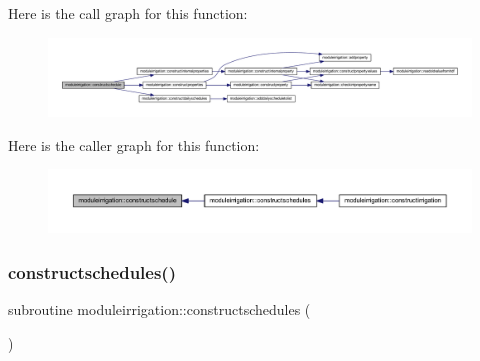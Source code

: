 Here is the call graph for this function\+:\nopagebreak
\begin{figure}[H]
\begin{center}
\leavevmode
\includegraphics[width=350pt]{namespacemoduleirrigation_a46de92ffaac8fbd782bdcdf682a48601_cgraph}
\end{center}
\end{figure}
Here is the caller graph for this function\+:\nopagebreak
\begin{figure}[H]
\begin{center}
\leavevmode
\includegraphics[width=350pt]{namespacemoduleirrigation_a46de92ffaac8fbd782bdcdf682a48601_icgraph}
\end{center}
\end{figure}
\mbox{\label{namespacemoduleirrigation_a6339c6a7568266fb2911688be44e1957}} 
\subsubsection{\texorpdfstring{constructschedules()}{constructschedules()}}
{\footnotesize\ttfamily subroutine moduleirrigation\+::constructschedules (\begin{DoxyParamCaption}{ }\end{DoxyParamCaption})\hspace{0.3cm}{\ttfamily [private]}}

